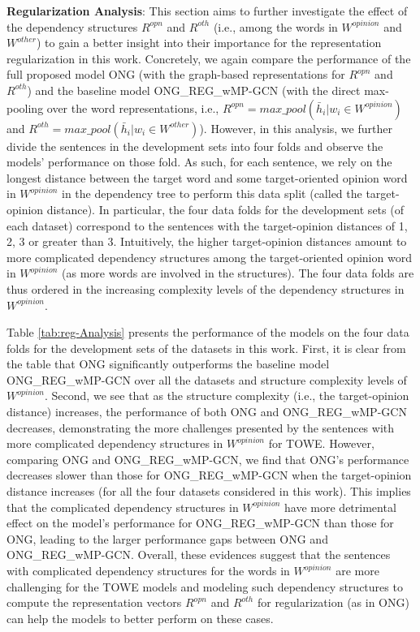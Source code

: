 \documentclass[11pt,a4paper]{article}
\begin{document}
\textbf{Regularization Analysis}: This section aims to further investigate the effect of the dependency structures $R^{opn}$ and $R^{oth}$ (i.e., among the words in $W^{opinion}$ and $W^{other}$) to gain a better insight into their importance for the representation regularization in this work. Concretely, we again compare the performance of the full proposed model ONG (with the graph-based representations for $R^{opn}$ and $R^{oth}$) and the baseline model ONG\_REG\_wMP-GCN (with the direct max-pooling over the word representations, i.e., $R^{opn} = max\_pool(\bar{h}_i|w_i \in W^{opinion})$ and $R^{oth} = max\_pool(\bar{h}_i|w_i \in W^{other})$). However, in this analysis, we further divide the sentences in the development sets into four folds and observe the models' performance on those fold. As such, for each sentence, we rely on the longest distance between the target word and some target-oriented opinion word in $W^{opinion}$ in the dependency tree to perform this data split (called the target-opinion distance). In particular, the four data folds for the development sets (of each dataset) correspond to the sentences with the target-opinion distances of 1, 2, 3 or greater than 3. Intuitively, the higher target-opinion distances amount to more complicated dependency structures among the target-oriented opinion word in $W^{opinion}$ (as more words are involved in the structures). The four data folds are thus ordered in the increasing complexity levels of the dependency structures in $W^{opinion}$.

Table \ref{tab:reg-Analysis} presents the performance of the models on the four data folds for the development sets of the datasets in this work. First, it is clear from the table that ONG significantly outperforms the baseline model ONG\_REG\_wMP-GCN over all the datasets and structure complexity levels of $W^{opinion}$. Second, we see that as the structure complexity (i.e., the target-opinion distance) increases, the performance of both ONG and ONG\_REG\_wMP-GCN decreases, demonstrating the more challenges presented by the sentences with more complicated dependency structures in $W^{opinion}$ for TOWE. However, comparing ONG and ONG\_REG\_wMP-GCN, we find that ONG's performance decreases slower than those for ONG\_REG\_wMP-GCN when the target-opinion distance increases (for all the four datasets considered in this work). This implies that the complicated dependency structures in $W^{opinion}$ have more detrimental effect on the model's performance for ONG\_REG\_wMP-GCN than those for ONG, leading to the larger performance gaps between ONG and ONG\_REG\_wMP-GCN. Overall, these evidences suggest that the sentences with complicated dependency structures for the words in $W^{opinion}$ are more challenging for the TOWE models and modeling such dependency structures to compute the representation vectors $R^{opn}$ and $R^{oth}$ for regularization (as in ONG) can help the models to better perform on these cases.
\end{document}
